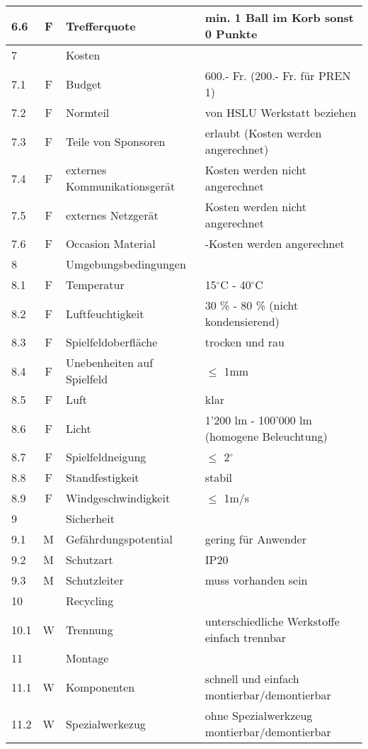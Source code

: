 \begin{longtable}[l]{|l|c|l|X|}
	\hline 6.6 & F & Trefferquote & min. 1 Ball im Korb sonst 0 Punkte \\
	\hline 7 &  & Kosten & \\
	\hline 7.1 & F & Budget & 600.- Fr. (200.- Fr. für PREN 1) \\
	\hline 7.2 & F & Normteil & von HSLU Werkstatt beziehen \\
	\hline 7.3 & F & Teile von Sponsoren & erlaubt (Kosten werden angerechnet) \\
	\hline 7.4 & F & externes Kommunikationsgerät & Kosten werden nicht angerechnet \\
	\hline 7.5 & F & externes Netzgerät & Kosten werden nicht angerechnet \\
	\hline 7.6 & F & Occasion Material & \textonehalf-Kosten werden angerechnet \\
	\hline 8 &  & Umgebungsbedingungen & \\
	\hline 8.1 & F & Temperatur & 15$^\circ$C - 40$^\circ$C \\
	\hline 8.2 & F & Luftfeuchtigkeit & 30 \% - 80 \% (nicht kondensierend) \\
	\hline 8.3 & F & Spielfeldoberfläche & trocken und rau \\
	\hline 8.4 & F & Unebenheiten auf Spielfeld & $\leq$ 1mm \\
	\hline 8.5 & F & Luft & klar \\
	\hline 8.6 & F & Licht & 1'200 lm - 100'000 lm (homogene Beleuchtung) \\
	\hline 8.7 & F & Spielfeldneigung & $\leq$ 2$^\circ$ \\
	\hline 8.8 & F & Standfestigkeit & stabil \\
	\hline 8.9 & F & Windgeschwindigkeit & $\leq$ 1m/s \\
	\hline 9 &  & Sicherheit & \\
	\hline 9.1 & M & Gefährdungspotential & gering für Anwender \\
	\hline 9.2 & M & Schutzart & IP20 \\
	\hline 9.3 & M & Schutzleiter & muss vorhanden sein \\
	\hline 10 &  & Recycling & \\
	\hline 10.1 & W & Trennung & unterschiedliche Werkstoffe einfach trennbar \\
	\hline 11 &  & Montage & \\
	\hline 11.1 & W & Komponenten & schnell und einfach montierbar/demontierbar \\
	\hline 11.2 & W & Spezialwerkezug & ohne Spezialwerkzeug montierbar/demontierbar \\
	\hline 
\end{longtable}